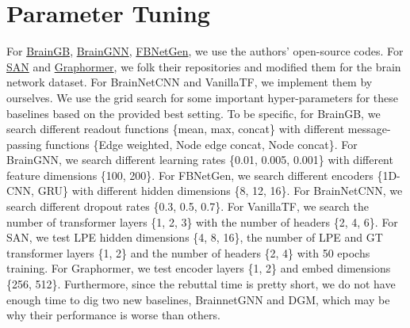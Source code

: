 


\section{Parameter Tuning}
\label{app:turing}
For \href{https://github.com/HennyJie/BrainGB}{BrainGB}, \href{https://github.com/xxlya/BrainGNN_Pytorch}{BrainGNN}, \href{https://github.com/Wayfear/FBNETGEN}{FBNetGen}, we use the authors' open-source codes. For \href{https://github.com/DevinKreuzer/SAN}{SAN} and \href{https://github.com/microsoft/Graphormer}{Graphormer}, we folk their repositories and modified them for the brain network dataset. For BrainNetCNN and VanillaTF, we implement them by ourselves. 
We use the grid search for some important hyper-parameters for these baselines based on the provided best setting. To be specific, for BrainGB, we search different readout functions \{mean, max, concat\} with different message-passing functions \{Edge weighted, Node edge concat, Node concat\}. For BrainGNN, we search different learning rates \{0.01, 0.005, 0.001\} with different feature dimensions \{100, 200\}. For FBNetGen, we search different encoders \{1D-CNN, GRU\} with different hidden dimensions \{8, 12, 16\}. For BrainNetCNN, we search different dropout rates \{0.3, 0.5, 0.7\}. For VanillaTF, we search the number of transformer layers \{1, 2, 3\} with the number of headers \{2, 4, 6\}. For SAN, we test LPE hidden dimensions \{4, 8, 16\}, the number of LPE and GT transformer layers  \{1, 2\} and the number of headers \{2, 4\} with 50 epochs training. For Graphormer, we test encoder layers \{1, 2\} and embed dimensions \{256, 512\}. Furthermore, since the rebuttal time is pretty short, we do not have enough time to dig two new baselines, BrainnetGNN and DGM, which may be why their performance is worse than others. 



